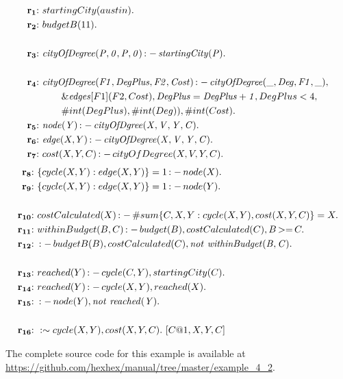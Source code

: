 \documentclass[a4paper, titlepage]{article}
\newcommand{\ext}[3]{\ensuremath{\&{\mathit{#1}}[#2](#3)}}
\DeclareMathOperator{\leftimpl}{:-}
\DeclareMathOperator{\nott}{\mathit{not}}
\DeclareMathOperator{\geeq}{>=}
\newcommand{\examplelink}[1]{\url{https://github.com/hexhex/manual/tree/master/#1}}
\newcommand{\rowprefix}[1]{%
  \ensuremath{\color{black}\mathbf{#1{:}}\ }%
}
\begin{document}
\begin{exmp}
\label{travellingsalesperson}
\begin{align*}
\rowprefix{r_1} & startingCity(austin).\\
\rowprefix{r_2} & budgetB(11).\\
\\
\rowprefix{r_3} & \mathit{cityOfDegree(P,0,P,0)} \leftimpl 
\mathit{startingCity(P).} \\
& \\
\rowprefix{r_4} & \mathit{cityOfDegree(F1, DegPlus, F2, Cost)} 
\leftimpl \mathit{cityOfDegree(\_, Deg, F1, \_)}, \\
& \qquad \ext{edges}{F1}{F2, Cost}, \mathit{DegPlus=DegPlus+1}, 
DegPlus < 4, \\ & \qquad \#int(DegPlus), \#int(Deg)), \#int(Cost). 
\\
\rowprefix{r_5}& \mathit{node(Y)} \leftimpl 
\mathit{cityOfDgree(X, V, Y, C)}.\\
\rowprefix{r_6}& \mathit{edge}(X, Y) \leftimpl 
\mathit{cityOfDegree(X, V, Y, C).} \\
\rowprefix{r_7} & cost(X,Y,C) \leftimpl cityOfDegree(X, V, Y, C). 
\end{align*}
\begin{align*}
\rowprefix{r_8} & \{ cycle(X,Y) : edge(X,Y) \} = 1 \leftimpl 
node(X). \\
\rowprefix{r_9} &  \{ cycle(X,Y) : edge(X,Y) \} = 1 \leftimpl 
node(Y). \\
& \\
\rowprefix{r_{10}} & costCalculated(X) \leftimpl \#sum \{C,X,Y : 
cycle(X,Y), cost(X,Y,C)\} = X. \\
\rowprefix{r_{11}} & withinBudget(B,C) \leftimpl budget(B), 
costCalculated(C), B \geeq C. \\
\rowprefix{r_{12}} & \leftimpl  budgetB(B), costCalculated(C), 
\nott \thinspace \mathit{withinBudget(B,C).} \\
& \\
\rowprefix{r_{13}} & reached(Y) \leftimpl cycle(C, Y), startingCity(C). \\
\rowprefix{r_{14}} & reached(Y) \leftimpl cycle(X,Y), 
reached(X). \\
\rowprefix{r_{15}} & \leftimpl node(Y), \nott \thinspace 
\mathit{reached(Y)}. \\
& \\
\rowprefix{r_{16}} & :\sim cycle(X,Y), cost(X,Y,C). \ [C@1,X,Y,C] 
\end{align*}
\end{exmp}
The complete source code for this example is available at \examplelink{example_4_2}.
\end{document}
